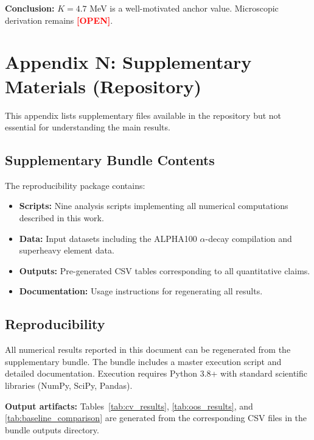 \documentclass[11pt,a4paper]{article}
\newcommand{\tagOPEN}{\textcolor{red}{\textbf{[OPEN]}}}
\begin{document}
\textbf{Conclusion:} $K = 4.7$ MeV is a well-motivated anchor value. Microscopic derivation remains \tagOPEN{}.

\section{Appendix N: Supplementary Materials (Repository)}
\label{app:supplementary}

This appendix lists supplementary files available in the repository but not essential for understanding the main results.

\subsection{Supplementary Bundle Contents}

The reproducibility package contains:
\begin{itemize}[nosep]
    \item \textbf{Scripts:} Nine analysis scripts implementing all numerical computations described in this work.
    \item \textbf{Data:} Input datasets including the ALPHA100 $\alpha$-decay compilation and superheavy element data.
    \item \textbf{Outputs:} Pre-generated CSV tables corresponding to all quantitative claims.
    \item \textbf{Documentation:} Usage instructions for regenerating all results.
\end{itemize}

\subsection{Reproducibility}

All numerical results reported in this document can be regenerated from the supplementary bundle. The bundle includes a master execution script and detailed documentation. Execution requires Python 3.8+ with standard scientific libraries (NumPy, SciPy, Pandas).

\textbf{Output artifacts:} Tables~\ref{tab:cv_results}, \ref{tab:oos_results}, and \ref{tab:baseline_comparison} are generated from the corresponding CSV files in the bundle outputs directory.

\end{document}

